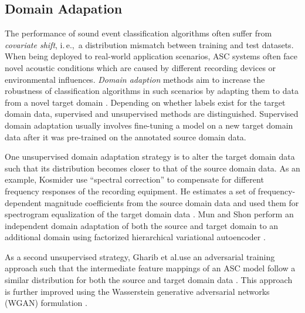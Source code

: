 \documentclass[applsci,article,submit,oneauthor,pdftex]{Definitions/mdpi}
\makeatletter
\newcommand{\etal}{{et al}.\@ }
\newcommand{\iec}{i.\,e.,\ }
\makeatother
\begin{document}
\subsection{Domain Adapation}
\label{sec:domain_adaptation}

The performance of sound event classification algorithms often suffer from \textit{covariate shift}, \iec a distribution mismatch between training and test datasets.
When being deployed to real-world application scenarios, ASC systems often face novel acoustic conditions which are caused by different recording devices or environmental influences.
\textit{Domain adaption} methods aim to increase the robustness of classification algorithms in such scenarios by adapting them to data from a novel target domain  \citep{Gharib:2018:DomainAdaptationASC:DCASE}.
Depending on whether labels exist for the target domain data, supervised and unsupervised methods are distinguished.
Supervised domain adaptation usually involves fine-tuning a model on a new target domain data after it was pre-trained on the annotated source domain data.


One unsupervised domain adaptation strategy is to alter the target domain data such that its distribution becomes closer to that of the source domain data.
As an example, Kosmider use ``spectral correction'' to compensate for different frequency responses of the recording equipment.
He estimates a set of frequency-dependent magnitude coefficients from the source domain data and used them for spectrogram equalization of the target domain data \citep{Kosmider:2019:DeviceCalibration:DCASE}. 
Mun and Shon perform an independent domain adaptation of both the source and target domain to an additional domain using factorized hierarchical variational autoencoder \citep{Mun:2019:DomainMismatch:ICASSP}.

As a second unsupervised strategy, Gharib \etal use an adversarial training approach such that the intermediate feature mappings of an ASC model follow a similar distribution for both the source and target domain data \citep{Gharib:2018:DomainAdaptationASC:DCASE}. This approach is further improved using the Wasserstein generative adversarial networks (WGAN) formulation \citep{Drossos:2019:DomainAdaptation:WASPAA}.
\end{document}
